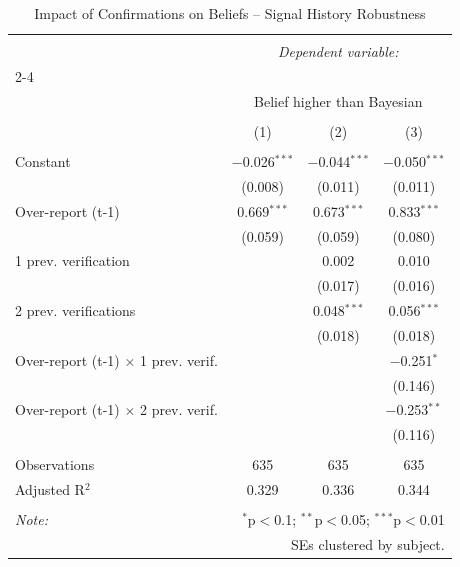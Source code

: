 
\begin{table}[!htbp] \centering 
  \caption{Impact of Confirmations on Beliefs -- Signal History Robustness} 
  \label{} 
\begin{tabular}{@{\extracolsep{5pt}}lccc} 
\\[-1.8ex]\hline 
\hline \\[-1.8ex] 
 & \multicolumn{3}{c}{\textit{Dependent variable:}} \\ 
\cline{2-4} 
\\[-1.8ex] & \multicolumn{3}{c}{Belief higher than Bayesian} \\ 
\\[-1.8ex] & (1) & (2) & (3)\\ 
\hline \\[-1.8ex] 
 Constant & $-$0.026$^{***}$ & $-$0.044$^{***}$ & $-$0.050$^{***}$ \\ 
  & (0.008) & (0.011) & (0.011) \\ 
  Over-report (t-1) & 0.669$^{***}$ & 0.673$^{***}$ & 0.833$^{***}$ \\ 
  & (0.059) & (0.059) & (0.080) \\ 
  1 prev. verification &  & 0.002 & 0.010 \\ 
  &  & (0.017) & (0.016) \\ 
  2 prev. verifications &  & 0.048$^{***}$ & 0.056$^{***}$ \\ 
  &  & (0.018) & (0.018) \\ 
  Over-report (t-1) $\times$ 1 prev. verif. &  &  & $-$0.251$^{*}$ \\ 
  &  &  & (0.146) \\ 
  Over-report (t-1) $\times$ 2 prev. verif. &  &  & $-$0.253$^{**}$ \\ 
  &  &  & (0.116) \\ 
 \hline \\[-1.8ex] 
Observations & 635 & 635 & 635 \\ 
Adjusted R$^{2}$ & 0.329 & 0.336 & 0.344 \\ 
\hline 
\hline \\[-1.8ex] 
\textit{Note:}  & \multicolumn{3}{r}{$^{*}$p$<$0.1; $^{**}$p$<$0.05; $^{***}$p$<$0.01} \\ 
 & \multicolumn{3}{r}{SEs clustered by subject.} \\ 
\end{tabular} 
\end{table} 
